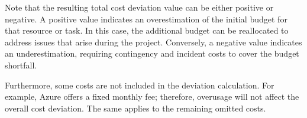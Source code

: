 \vspace{2pt}

Note that the resulting total cost deviation value can be either positive or negative. A positive value indicates an overestimation of the initial budget for that resource or task. In this case, the additional budget can be reallocated to address issues that arise during the project. Conversely, a negative value indicates an underestimation, requiring contingency and incident costs to cover the budget shortfall.

Furthermore, some costs are not included in the deviation calculation. For example, Azure offers a fixed monthly fee; therefore, overusage will not affect the overall cost deviation. The same applies to the remaining omitted costs. 



